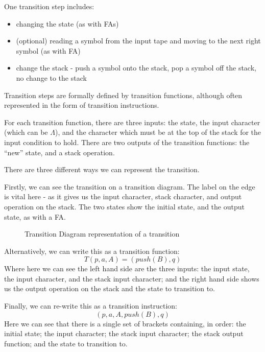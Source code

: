 One transition step includes:
\begin{itemize}
    \item changing the state (as with FAs)
    \item (optional) reading a symbol from the input tape and moving to the next right symbol (as with FA) 
    \item change the stack - push a symbol onto the stack, pop a symbol off the stack, no change to the stack
\end{itemize}

Transition steps are formally defined by transition functions, although often represented in the form of transition instructions. 

For each transition function, there are three inputs: the state, the input character (which can be $\Lambda$), and the character which must be at the top of the stack for the input condition to hold. There are two outputs of the transition functions: the ``new'' state, and a stack operation.

There are three different ways we can represent the transition.

Firstly, we can see the transition on a transition diagram. The label on the edge is vital here - as it gives us the input character, stack character, and output operation on the stack. The two states show the initial state, and the output state, as with a FA.

\begin{figure}[H]
    \centering
    \caption{Transition Diagram representation of a transition}
\end{figure}

Alternatively, we can write this as a transition function:
\[T(p, a, A) = (push(B), q)\]
Where here we can see the left hand side are the three inputs: the input state, the input character, and the stack input character; and the right hand side shows us the output operation on the stack and the state to transition to. 

Finally, we can re-write this as a transition instruction:
\[(p, a, A, push(B), q)\]
Here we can see that there is a single set of brackets containing, in order: the initial state; the input character; the stack input character; the stack output function; and the state to transition to. 

